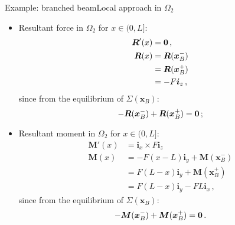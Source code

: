 \documentclass{beamer}
\newcommand{\xj}{x}
\newcommand{\yj}{y}
\newcommand{\zj}{z}
\newcommand{\xv}{{\boldsymbol\xj}}
\renewcommand{\ij}{i}
\newcommand{\iv}{{\boldsymbol\ij}}
\newcommand{\medium}{\Omega}
\newcommand{\Fresj}{R}
\newcommand{\Mresj}{M}
\newcommand{\Fres}{{\boldsymbol\Fresj}}
\newcommand{\Mres}{{\boldsymbol\Mresj}}
\newcommand{\bzero}{{\bf 0}}
\begin{document}
\begin{frame}{Example: branched beam}{Local approach in $\medium_2$}

\begin{overprint}

\begin{itemize}
\item Resultant force in $\medium_2$ for $\xj\in(0,L]$:
\begin{displaymath}
\begin{split}
\Fres'(\xj) &=\bzero\,, \\
\Fres(\xj) &=\Fres(\xv_B^-) \\
&=\Fres(\xv_B^+) \\
&=-F\iv_\zj\,,
\end{split}
\end{displaymath}
since from the equilibrium of $\Sigma(\xv_B)$:
\begin{displaymath}
-\Fres(\xv_B^-)+\Fres(\xv_B^+)=\bzero\,;
\end{displaymath}
\end{itemize}

\begin{itemize}
\item Resultant moment in $\medium_2$ for $\xj\in(0,L]$:
\begin{displaymath}
\begin{split}
\Mres'(\xj) &=\iv_\xj\times F\iv_\zj \\
\Mres(\xj) &=-F(\xj-L)\iv_\yj+\Mres(\xv_B^-) \\
&=F(L-\xj)\iv_\yj+\Mres(\xv_B^+) \\
&=F(L-\xj)\iv_\yj-FL\iv_\xj\,,
\end{split}
\end{displaymath}
since from the equilibrium of $\Sigma(\xv_B)$:
\begin{displaymath}
-\Mres(\xv_B^-)+\Mres(\xv_B^+)=\bzero\,.
\end{displaymath}
\end{itemize}

\end{overprint}

\end{frame}
\end{document}
